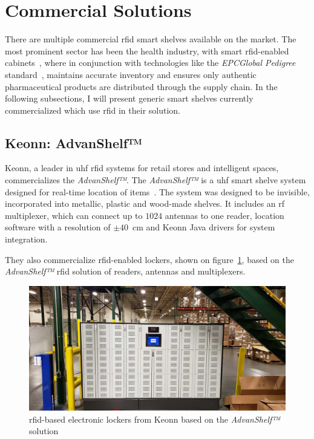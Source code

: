 \section{Commercial Solutions} \label{sec:commercialsolutions}

There are multiple commercial \ac{rfid} smart shelves available on the market.
The most prominent sector has been the health industry, with smart \ac{rfid}-enabled cabinets~\cite{RFIDSmartCabinets, RFIDTechnologyCabinet, DyaneSmartCabinetSmart,RFIDEnabledCabinetry}, where in conjunction with technologies like the \emph{EPCGlobal Pedigree} standard~\cite{PedigreeStandardV1}, maintains accurate inventory and ensures only authentic pharmaceutical products are distributed through the supply chain.
In the following subsections, I will present generic smart shelves currently commercialized which use \ac{rfid} in their solution.

\subsection{Keonn: AdvanShelf™} \label{sec:keonnsolutions}

Keonn, a leader in \ac{uhf} \ac{rfid} systems for retail stores and intelligent spaces, commercializes the \emph{AdvanShelf™}.
The \emph{AdvanShelf™} is a \ac{uhf} smart shelve system designed for real-time location of items~\cite{AdvanShelfRFIDSmart}.
The system was designed to be invisible, incorporated into metallic, plastic and wood-made shelves.
It includes an \ac{rf} multiplexer, which can connect up to $1024$ antennas to one reader, location software with a resolution of $\pm40$~cm and Keonn Java drivers for system integration.

They also commercialize \ac{rfid}-enabled lockers, shown on figure~\ref{fig:keonnlocker}, based on the \emph{AdvanShelf™} \ac{rfid} solution of readers, antennas and multiplexers.

\begin{figure}[!ht]
    \centering
    \includegraphics[width=1\textwidth]{./figs/02-state-of-the-art/keonn_lockers.jpg}
    \caption[\ac{rfid}-based electronic lockers from Keonn]{\ac{rfid}-based electronic lockers from Keonn based on the \emph{AdvanShelf™} solution~\cite{RFIDenabledLockersProvide}} 
    \label{fig:keonnlocker}
\end{figure}

